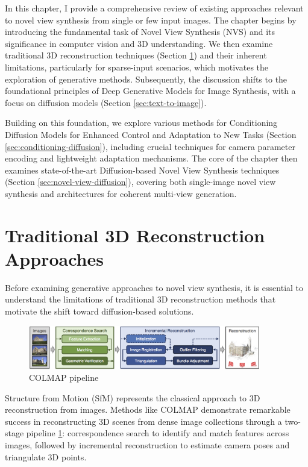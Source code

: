\label{chapter:related}

In this chapter, I provide a comprehensive review of existing approaches relevant to novel view synthesis from single or few input images. The chapter begins by introducing the fundamental task of Novel View Synthesis (NVS) and its significance in computer vision and 3D understanding. We then examine traditional 3D reconstruction techniques (Section \ref{sec:3d-reconstruction}) and their inherent limitations, particularly for sparse-input scenarios, which motivates the exploration of generative methods. Subsequently, the discussion shifts to the foundational principles of Deep Generative Models for Image Synthesis, with a focus on diffusion models (Section \ref{sec:text-to-image}).

Building on this foundation, we explore various methods for Conditioning Diffusion Models for Enhanced Control and Adaptation to New Tasks (Section \ref{sec:conditioning-diffusion}), including crucial techniques for camera parameter encoding and lightweight adaptation mechanisms. The core of the chapter then examines state-of-the-art Diffusion-based Novel View Synthesis techniques (Section \ref{sec:novel-view-diffusion}), covering both single-image novel view synthesis and architectures for coherent multi-view generation.

\section{Traditional 3D Reconstruction Approaches}\label{sec:3d-reconstruction}

Before examining generative approaches to novel view synthesis, it is essential to understand the limitations of traditional 3D reconstruction methods that motivate the shift toward diffusion-based solutions.

\begin{figure}[h]
  \centering
  \includegraphics[width=0.9\textwidth]{images/related-work/COLMAP.png}
  \caption{COLMAP pipeline}
  \label{fig:colmap-pipeline}
\end{figure}
Structure from Motion (SfM) represents the classical approach to 3D reconstruction from images. Methods like COLMAP \cite{colmap} demonstrate remarkable success in reconstructing 3D scenes from dense image collections through a two-stage pipeline \ref{fig:colmap-pipeline}: correspondence search to identify and match features across images, followed by incremental reconstruction to estimate camera poses and triangulate 3D points.

